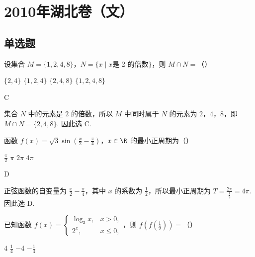 \chapter{2010年湖北卷（文）}

\section{单选题}

\begin{problem}
设集合 \(M = \{1, 2, 4, 8\}\)，\(N = \{x \mid x\text{是 2 的倍数}\}\)，则 \(M \cap N =\)（\quad）

\choices
    {\(\{2, 4\}\)}
    {\(\{1, 2, 4\}\)}
    {\(\{2,4,8\}\)}
    {\(\{1, 2, 4, 8\}\)}
\end{problem}

\begin{answer}
C
\end{answer}

\begin{solution}
集合 \(N\) 中的元素是 \(2\) 的倍数，所以 \(M\) 中同时属于 \(N\) 的元素为 \(2\)，\(4\)，\(8\)，即 \(M\cap N=\{2,4,8\}\). 因此选 C.
\end{solution}

\begin{problem}
函数 \( f(x) = \sqrt{3} \sin \left( \frac{x}{2} - \frac{\pi}{4} \right) \)，\( x \in \R \) 的最小正周期为（\quad）

\choices
    {\(\frac{\pi}{2}\)}
    {\(\pi\)}
    {\(2\pi\)}
    {\(4\pi\)}
\end{problem}

\begin{answer}
D
\end{answer}

\begin{solution}
正弦函数的自变量为 \(\frac{x}{2}-\frac{\pi}{4}\)，其中 \(x\) 的系数为 \(\frac{1}{2}\)，所以最小正周期为 \(T=\frac{2\pi}{\frac{1}{2}}=4\pi\). 因此选 D.
\end{solution}

\begin{problem}
已知函数 \( f(x) = \begin{cases}
\log_{3} x, & x > 0,\\
2^x, & x \leqslant 0,
\end{cases} \)，则 \( f\left(f\left(\frac{1}{9}\right)\right) = \)（\quad）

\choices
    {\(4\)}
    {\(\frac{1}{4}\)}
    {\(-4\)}
    {\(-\frac{1}{4}\)}
\end{problem}

